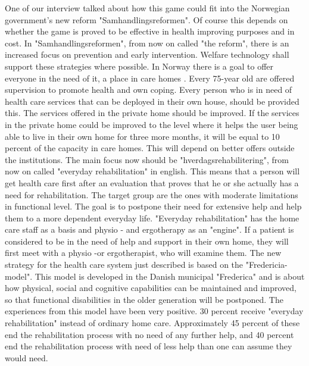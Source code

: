One of our interview talked about how this game could fit into the Norwegian government’s new reform "Samhandlingsreformen". Of course this depends on whether the game is proved to be effective in health improving purposes and in cost. In "Samhandlingsreformen", from now on called "the reform", there is an increased focus on prevention and early intervention. Welfare technology shall support these strategies where possible. In Norway there is a goal to offer everyone in the need of it, a place in care homes . Every 75-year old are offered supervision to promote health and own coping. Every person who is in need of health care services that can be deployed in their own house, should be provided this. The services offered in the private home should be improved. If the services in the private home could be improved to the level where it helps the user being able to live in their own home for three more months, it will be equal to 10 percent of the capacity in care homes. This will depend on better offers outside the institutions. The main focus now should be "hverdagsrehabilitering", from now on called  "everyday rehabilitation" in english. This means that a person will get health care first after an evaluation that proves that he or she actually has a need for rehabilitation. The target group are the ones with moderate limitations in functional level. The goal is to postpone their need for extensive help and help them to a more dependent everyday life.  "Everyday rehabilitation" has the home care staff as a basis and physio - and ergotherapy as an "engine". If a patient is considered to be in the need of help and support in their own home, they will first meet with a physio -or ergotherapist, who will examine them. The new strategy for the health care system just described is based on the "Fredericia-model". This model is developed in the Danish municipal "Frederica" and is about how physical, social and cognitive capabilities can be maintained and improved, so that functional disabilities in the older generation will be postponed. The experiences from this model have been very positive. 30 percent receive "everyday rehabilitation" instead of ordinary home care. Approximately 45 percent of these end the rehabilitation process with no need of any further help, and 40 percent end the rehabilitation process with need of less help than one can assume they would need.\cite{budsjett} \\ \\
